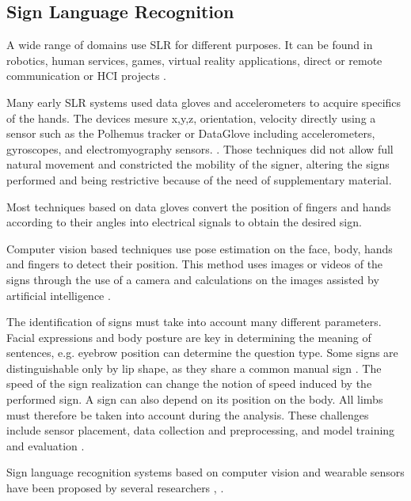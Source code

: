 \subsection{Sign Language Recognition}

A wide range of domains use SLR for different purposes. It can be found in robotics, human services, games, virtual reality applications, direct or remote communication or HCI projects \cite{adeyanju2021machine}.

Many early SLR systems used data gloves and accelerometers to acquire specifics of the hands. The devices mesure x,y,z, orientation, velocity directly using a sensor such as the Polhemus tracker \cite{413199} \cite{5738842} or DataGlove \cite{Kadous1970} \cite{Metaxas1970} including accelerometers, gyroscopes, and electromyography sensors. . Those techniques did not allow full natural movement and constricted the mobility of the signer, altering the signs performed and being restrictive because of the need of supplementary material.

Most techniques based on data gloves convert the position of fingers and hands according to their angles into electrical signals to obtain the desired sign. 

Computer vision based techniques use pose estimation on the face, body, hands and fingers to detect their position. This method uses images or videos of the signs through the use of a camera and calculations on the images assisted by artificial intelligence \cite{adeyanju2021machine}. 

The identification of signs must take into account many different parameters. Facial expressions and body posture are key in determining the meaning of sentences, e.g. eyebrow position can determine the question type. Some signs are distinguishable only by lip shape, as they share a
common manual sign \cite{cooper2011sign}. The speed of the sign realization can change the notion of speed induced by the performed sign. A sign can also depend on its position on the body. All limbs must therefore be taken into account during the analysis. These challenges include sensor placement, data collection and preprocessing, and model training and evaluation \cite{9178440}.

Sign language recognition systems based on computer vision and wearable sensors have been proposed by several researchers \cite{ionescu2005dynamic} \cite{yu2010vision} \cite{li2015feature} \cite{sonkusare2015review} \cite{bobic2016hand} \cite{islam2017real} \cite{islam2017real} \cite{saha2018machine}, \cite{rastgoo2021hand} \cite{xu2021application}. 

